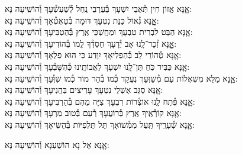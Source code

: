 \documentclass[twoside, openany, parskip=half, 11pt]{book}
\begin{document}
\begin{small}
אׇׇנָּא אֱזוֹן חִין תְּ֯אֵבֵי יִשְׁעָךְ בְּ֯עַרְבֵי נַֽחַל לְ֯שַׁעְשְׁ֯עָךְ \hfill וְ֯הוֹשִֽׁיעָה נָּא:\\
אׇׇׇׇָנָּא גְּ֯אוֹל כַּנַּת נִטְעָךְ דּוּמָה בְּ֯טַאְטְ֯אָךְ \hfill וְ֯הוֹשִֽׁיעָה נָּא:\\
אׇׇנָּא הַבֵּט לִבְרִית טִבְעָךְ וּמַחֲשַׁכֵּי אֶֽרֶץ בְּ֯הַטְבִּיעָךְ \hfill וְ֯הוֹשִֽׁיעָה נָּא:\\
אׇׇׇׇָנָּא זְ֯כָר־לָֽנוּ אָב יְ֯דָעָךְ חַסְדְּ֯ךָ לָֽמוֹ בְּ֯הוֹדִיעָךְ \hfill וְ֯הוֹשִֽׁיעָה נָּא:\\
אׇׇנָּא טְ֯הוֹרֵי לֵב בְּ֯הַפְלִיאָךְ יִוָּדַע כִּי הוּא פִלְאָךְ \hfill וְ֯הוֹשִֽׁיעָה נָּא:\\
אׇׇנָּא כַּבִּיר כֹּֽחַ תֶּן־לָֽנוּ יִשְׁעָךְ לַאֲבוֹתֵֽינוּ כְּ֯הִשָּׁבְ֯עָךְ \hfill וְ֯הוֹשִֽׁיעָה נָּא:\\
אׇׇנָּא מַלֵּא מִשְׁאֲלוֹת עַם מְ֯שַׁוְּעָךְ נֶעֱקָד כְּ֯מוֹ בְּ֯הַר מוֹר כְּ֯מוֹ שִׁוְּ֯עָךְ \hfill וְ֯הוֹשִֽׁיעָה נָּא:\\
אׇׇנָּא סַגֵּב אֶשְׁלֵי נִטְעָךְ עָרִיצִים בַּהֲנִיעָךְ \hfill וְ֯הוֹשִֽׁיעָה נָּא:\\
אׇׇנָּא פְּ֯תַח לָֽנוּ אוֹצְ֯רוֹת רִבְעָךְ צִיָּה מֵהֶם בְּ֯הַרְבִּיעָךְ \hfill וְ֯הוֹשִֽׁיעָה נָּא:\\
אׇׇנָּא קוֹרְ֯אֶֽיךָ אֶֽרֶץ בְּ֯רוֹעֲעָךְ רְ֯עֵם בְּ֯טוּב מִרְעָךְ \hfill וְ֯הוֹשִֽׁיעָה נָּא:\\
אׇׇנָּא שְׁ֯עָרֶֽיךָ תַּֽעַל מִמְּ֯שׁוֹאָךְ תֵּל תַּלְפִּיּוֹת בְּ֯הַשִּׂיאָךְ \hfill וְ֯הוֹשִֽׁיעָה נָּא:

\end{small}

\begin{large}
\shatzvkahal
אׇׇנָּא אֵל נָא הוֹשַׁעְנָא וְ֯הוֹשִֽׁיעָה נָּא:

\end{large}
\end{document}
